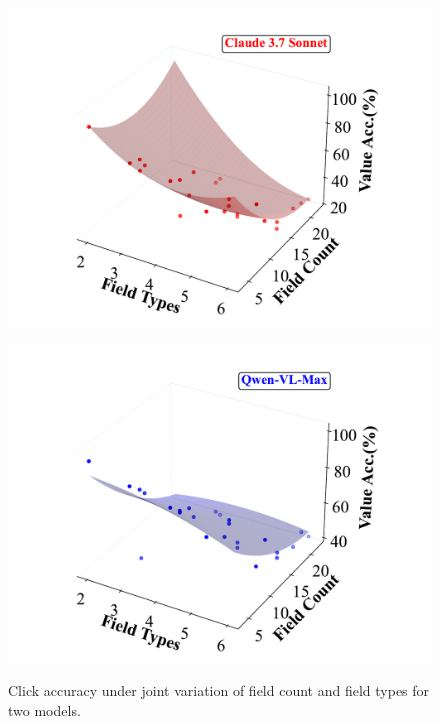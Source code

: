\documentclass[sigconf, screen, review]{acmart}
\begin{document}
\begin{figure}[htbp]
    \centering
    \begin{minipage}[t]{0.45\linewidth}
        \centering
        \includegraphics[width=\linewidth]{figs/7.pdf}
        \label{fig:ruler1}
    \end{minipage}%
    \hspace{0.01\linewidth}
    \begin{minipage}[t]{0.45\linewidth}
        \centering
        \includegraphics[width=\linewidth]{figs/8.pdf}
        \label{fig:ruler2}
    \end{minipage}
    \vspace{-20pt}
    \caption{
    Click accuracy under joint variation of field count and field types for two models.
    }
    \vspace{-10pt}
    \label{fig:3d}
\end{figure}
\end{document}
